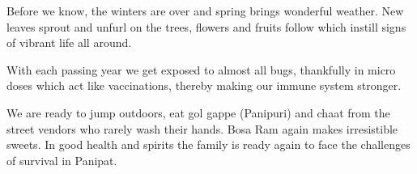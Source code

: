 Before we know, the winters are over and spring brings wonderful weather.
New leaves sprout and unfurl on the trees, flowers and fruits follow which
instill signs of vibrant life all around. 

With each passing year we get exposed to almost all bugs, thankfully in
micro doses which act like vaccinations, thereby making our immune system
stronger. 

We are ready to jump outdoors, eat gol gappe (Panipuri) and chaat from the
street vendors who rarely wash their hands. Bosa Ram again makes
irresistible sweets. In good health and spirits the family is ready again
to face the challenges of survival in Panipat. 
